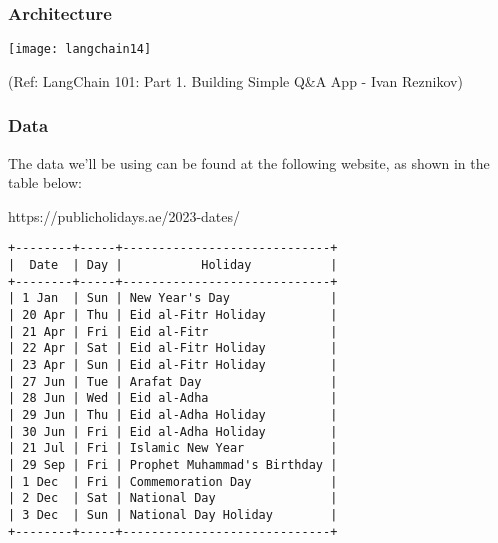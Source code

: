 \begin{frame}[fragile]\frametitle{Architecture}

  
			\begin{center}
			\texttt{[image: langchain14]}
			\end{center}	  


			{\tiny (Ref: LangChain 101: Part 1. Building Simple Q\&A App - Ivan Reznikov)}


\end{frame}


\begin{frame}[fragile]\frametitle{Data}

  The data we’ll be using can be found at the following website, as shown in the table below:
  
  https://publicholidays.ae/2023-dates/
  
\begin{lstlisting}
+--------+-----+-----------------------------+
|  Date  | Day |           Holiday           |
+--------+-----+-----------------------------+
| 1 Jan  | Sun | New Year's Day              |
| 20 Apr | Thu | Eid al-Fitr Holiday         |
| 21 Apr | Fri | Eid al-Fitr                 |
| 22 Apr | Sat | Eid al-Fitr Holiday         |
| 23 Apr | Sun | Eid al-Fitr Holiday         |
| 27 Jun | Tue | Arafat Day                  |
| 28 Jun | Wed | Eid al-Adha                 |
| 29 Jun | Thu | Eid al-Adha Holiday         |
| 30 Jun | Fri | Eid al-Adha Holiday         |
| 21 Jul | Fri | Islamic New Year            |
| 29 Sep | Fri | Prophet Muhammad's Birthday |
| 1 Dec  | Fri | Commemoration Day           |
| 2 Dec  | Sat | National Day                |
| 3 Dec  | Sun | National Day Holiday        |
+--------+-----+-----------------------------+
\end{lstlisting}	  


\end{frame}

